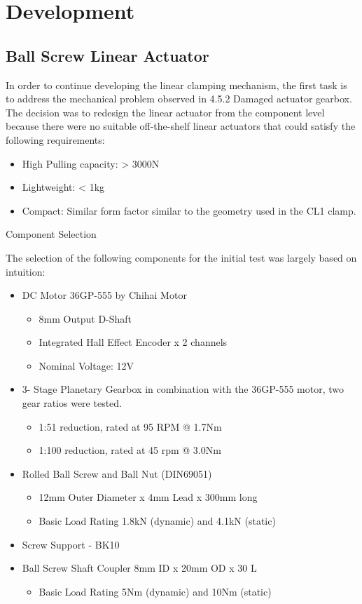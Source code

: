 \section{Development}

\subsection{Ball Screw Linear Actuator}

In order to continue developing the linear clamping mechanism, the first task is to address the mechanical problem observed in 4.5.2 Damaged actuator gearbox. The decision was to redesign the linear actuator from the component level because there were no suitable off-the-shelf linear actuators that could satisfy the following requirements:
\begin{itemize}
    \item High Pulling capacity: > 3000N
    \item Lightweight: < 1kg
    \item Compact: Similar form factor similar to the geometry used in the CL1 clamp.
\end{itemize}

Component Selection

The selection of the following components for the initial test was largely based on intuition:
\begin{itemize}
    \item DC Motor 36GP-555 by Chihai Motor
    \begin{itemize}
        \item 8mm Output D-Shaft 
        \item Integrated Hall Effect Encoder x 2 channels
        \item Nominal Voltage: 12V
    \end{itemize}
    \item 3- Stage Planetary Gearbox in combination with the 36GP-555 motor, two gear ratios were tested.
    \begin{itemize}
        \item 1:51 reduction, rated at 95 RPM @ 1.7Nm
        \item 1:100 reduction, rated at 45 rpm @ 3.0Nm
    \end{itemize} 
    \item  Rolled Ball Screw and Ball Nut (DIN69051)
    \begin{itemize}
        \item 12mm Outer Diameter x 4mm Lead x 300mm long
        \item Basic Load Rating 1.8kN (dynamic) and 4.1kN (static)
    \end{itemize}
    \item Screw Support - BK10
    \item Ball Screw Shaft Coupler 8mm ID x 20mm OD x 30 L
    \begin{itemize}
        \item Basic Load Rating 5Nm (dynamic) and 10Nm (static)
    \end{itemize}
\end{itemize}

